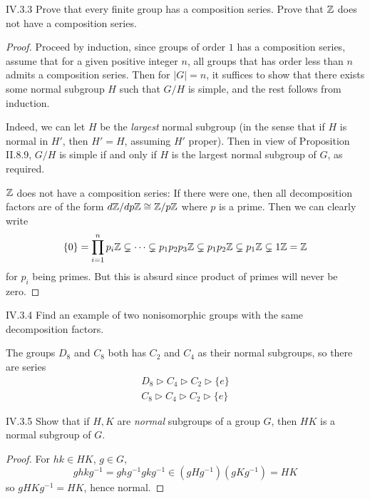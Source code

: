 \begin{problem}{IV.3.3}
Prove that every finite group has a composition series. Prove that $\mathbb{Z}$ does not have a composition series. 
\end{problem}
\begin{proof}
Proceed by induction, since groups of order $1$ has a composition series, assume that for a given positive integer $n$, all groups that has order less than $n$ admits a composition series. Then for $|G|=n$, it suffices to show that there exists some normal subgroup $H$ such that $G/H$ is simple, and the rest follows from induction. 

Indeed, we can let $H$ be the \emph{largest} normal subgroup (in the sense that if $H$ is normal in $H'$, then $H' = H$, assuming $H'$ proper). Then in view of Proposition II.8.9, $G/H$ is simple if and only if $H$ is the largest normal subgroup of $G$, as required.

$\mathbb{Z}$ does not have a composition series: If there were one, then all decomposition factors are of the form $d\mathbb{Z}/dp\mathbb{Z} \cong \mathbb{Z}/p\mathbb{Z}$ where $p$ is a prime. Then we can clearly write 
\[
\{0\} = \prod_{i = 1}^n p_i\mathbb{Z} \subsetneq \cdots \subsetneq p_1p_2p_3\mathbb{Z}  \subsetneq p_1p_2\mathbb{Z} \subsetneq p_1\mathbb{Z} \subsetneq 1\mathbb{Z} = \mathbb{Z}
\]
for $p_i$ being primes. But this is absurd since product of primes will never be zero.
\end{proof}

\begin{problem}{IV.3.4}
Find an example of two nonisomorphic groups with the same decomposition factors.
\end{problem}
\begin{solution}
The groups $D_8$ and $C_8$ both has $C_2$ and $C_4$ as their normal subgroups, so there are series 
\begin{align*}
D_8 \triangleright C_4 \triangleright C_2 \triangleright \{e\} \\
C_8 \triangleright C_4 \triangleright C_2 \triangleright \{e\}
\end{align*}
\end{solution}

\begin{problem}{IV.3.5}
Show that if $H, K$ are \emph{normal} subgroups of a group $G$, then $HK$ is a normal subgroup of $G$. 
\end{problem} 
\begin{proof}
For $hk \in HK$, $g \in G$,
\[
ghkg^{-1} = ghg^{-1}gkg^{-1} \in (gHg^{-1})(gKg^{-1}) = HK
\]
so $gHKg^{-1} = HK$, hence normal.
\end{proof}

